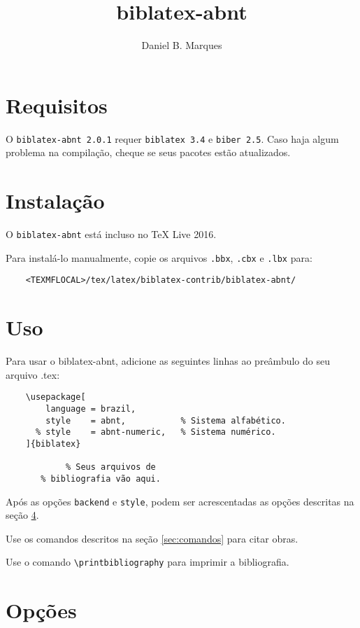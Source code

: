 \documentclass[a4paper]{article}
\title{biblatex-abnt \version}
\author{Daniel B. Marques}
\newcommand{\version}{2.0.1}
\newcommand{\requirements}{\texttt{biblatex 3.4} e \texttt{biber 2.5}}
\begin{document}
\maketitle

\tableofcontents

\clearpage
\section{Requisitos}

O \texttt{biblatex-abnt \version} requer \requirements. Caso haja algum
problema na compilação, cheque se seus pacotes estão atualizados.

\section{Instalação}

O \texttt{biblatex-abnt} está incluso no TeX Live 2016.

Para instalá-lo manualmente, copie os arquivos \texttt{.bbx}, \texttt{.cbx} e
\texttt{.lbx} para:
\begin{verbatim}
    <TEXMFLOCAL>/tex/latex/biblatex-contrib/biblatex-abnt/
\end{verbatim}

\section{Uso}

Para usar o {biblatex-abnt}, adicione as seguintes linhas ao preâmbulo do seu
arquivo {.tex}:

\begin{verbatim}
    \usepackage[
        language = brazil,
        style    = abnt,           % Sistema alfabético.
      % style    = abnt-numeric,   % Sistema numérico.
    ]{biblatex}

            % Seus arquivos de
       % bibliografia vão aqui.
\end{verbatim}

Após as opções \texttt{backend} e \texttt{style}, podem ser acrescentadas
as opções descritas na seção \ref{sec:opções}.

Use os comandos descritos na seção \ref{sec:comandos} para citar obras.

Use o comando \verb"\printbibliography" para imprimir a bibliografia.

\clearpage
\section{Opções}
\label{sec:opções}
\end{document}
